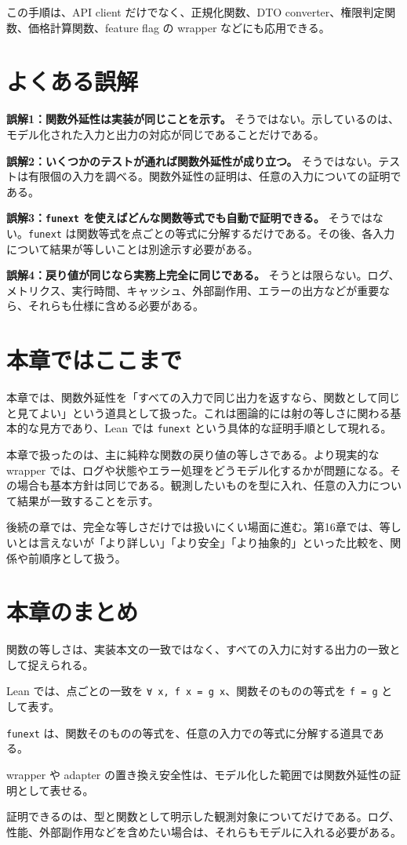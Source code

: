 この手順は、API client だけでなく、正規化関数、DTO converter、権限判定関数、価格計算関数、feature flag の wrapper などにも応用できる。

\section{よくある誤解}

\begin{warningbox}
\textbf{誤解1：関数外延性は実装が同じことを示す。} そうではない。示しているのは、モデル化された入力と出力の対応が同じであることだけである。

\medskip
\textbf{誤解2：いくつかのテストが通れば関数外延性が成り立つ。} そうではない。テストは有限個の入力を調べる。関数外延性の証明は、任意の入力についての証明である。

\medskip
\textbf{誤解3：\texttt{funext} を使えばどんな関数等式でも自動で証明できる。} そうではない。\texttt{funext} は関数等式を点ごとの等式に分解するだけである。その後、各入力について結果が等しいことは別途示す必要がある。

\medskip
\textbf{誤解4：戻り値が同じなら実務上完全に同じである。} そうとは限らない。ログ、メトリクス、実行時間、キャッシュ、外部副作用、エラーの出方などが重要なら、それらも仕様に含める必要がある。
\end{warningbox}

\section{本章ではここまで}

本章では、関数外延性を「すべての入力で同じ出力を返すなら、関数として同じと見てよい」という道具として扱った。これは圏論的には射の等しさに関わる基本的な見方であり、Lean では \texttt{funext} という具体的な証明手順として現れる。

本章で扱ったのは、主に純粋な関数の戻り値の等しさである。より現実的な wrapper では、ログや状態やエラー処理をどうモデル化するかが問題になる。その場合も基本方針は同じである。観測したいものを型に入れ、任意の入力について結果が一致することを示す。

後続の章では、完全な等しさだけでは扱いにくい場面に進む。第16章では、等しいとは言えないが「より詳しい」「より安全」「より抽象的」といった比較を、関係や前順序として扱う。

\section{本章のまとめ}

関数の等しさは、実装本文の一致ではなく、すべての入力に対する出力の一致として捉えられる。

Lean では、点ごとの一致を \texttt{∀ x, f x = g x}、関数そのものの等式を \texttt{f = g} として表す。

\texttt{funext} は、関数そのものの等式を、任意の入力での等式に分解する道具である。

wrapper や adapter の置き換え安全性は、モデル化した範囲では関数外延性の証明として表せる。

証明できるのは、型と関数として明示した観測対象についてだけである。ログ、性能、外部副作用などを含めたい場合は、それらもモデルに入れる必要がある。
